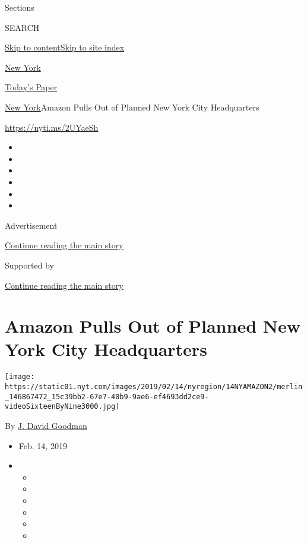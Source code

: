 Sections

SEARCH

\protect\hyperlink{site-content}{Skip to
content}\protect\hyperlink{site-index}{Skip to site index}

\href{https://www.nytimes.com/section/nyregion}{New York}

\href{https://myaccount.nytimes.com/auth/login?response_type=cookie\&client_id=vi}{}

\href{https://www.nytimes.com/section/todayspaper}{Today's Paper}

\href{/section/nyregion}{New York}\textbar{}Amazon Pulls Out of Planned
New York City Headquarters

\url{https://nyti.ms/2UYaeSh}

\begin{itemize}
\item
\item
\item
\item
\item
\item
\end{itemize}

Advertisement

\protect\hyperlink{after-top}{Continue reading the main story}

Supported by

\protect\hyperlink{after-sponsor}{Continue reading the main story}

\hypertarget{amazon-pulls-out-of-planned-new-york-city-headquarters}{%
\section{Amazon Pulls Out of Planned New York City
Headquarters}\label{amazon-pulls-out-of-planned-new-york-city-headquarters}}

\texttt{[image: https://static01.nyt.com/images/2019/02/14/nyregion/14NYAMAZON2/merlin\_146867472\_15c39bb2-67e7-40b9-9ae6-ef4693dd2ce9-videoSixteenByNine3000.jpg]}

By \href{https://www.nytimes.com/by/j-david-goodman}{J. David Goodman}

\begin{itemize}
\item
  Feb. 14, 2019
\item
  \begin{itemize}
  \item
  \item
  \item
  \item
  \item
  \item
  \end{itemize}
\end{itemize}

